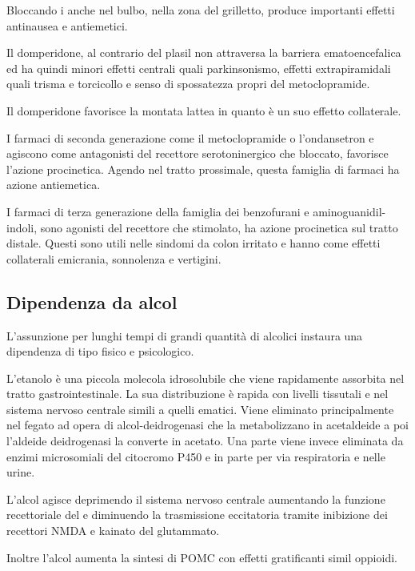 Bloccando i  anche nel bulbo, nella zona del grilletto, produce importanti effetti antinausea e antiemetici.

Il domperidone, al contrario del plasil non attraversa la barriera ematoencefalica ed ha quindi minori effetti centrali quali parkinsonismo, effetti extrapiramidali quali trisma e torcicollo e senso di spossatezza propri del metoclopramide.

Il domperidone favorisce la montata lattea in quanto è un suo effetto collaterale.

I farmaci di seconda generazione come il metoclopramide o l'ondansetron e agiscono come antagonisti del recettore serotoninergico  che bloccato, favorisce l'azione procinetica. Agendo nel tratto prossimale, questa famiglia di farmaci ha azione antiemetica.

I farmaci di terza generazione della famiglia dei benzofurani e aminoguanidil-indoli, sono agonisti del recettore  che stimolato, ha azione procinetica sul tratto distale. Questi sono utili nelle sindomi da colon irritato e hanno come effetti collaterali emicrania, sonnolenza e vertigini.

\subsection{Dipendenza da alcol}

L'assunzione per lunghi tempi di grandi quantità di alcolici instaura una dipendenza di tipo fisico e psicologico.

L'etanolo è una piccola molecola idrosolubile che viene rapidamente assorbita nel tratto gastrointestinale. La sua distribuzione è rapida con livelli tissutali e nel sistema nervoso centrale simili a quelli ematici. Viene eliminato principalmente nel fegato ad opera di alcol-deidrogenasi che la metabolizzano in acetaldeide a poi l'aldeide deidrogenasi la converte in acetato. Una parte viene invece eliminata da enzimi microsomiali del citocromo P450 e in parte per via respiratoria e nelle urine.

L'alcol agisce deprimendo il sistema nervoso centrale aumentando la funzione recettoriale del  e diminuendo la trasmissione eccitatoria tramite inibizione dei recettori NMDA e kainato del glutammato.

Inoltre l'alcol aumenta la sintesi di POMC con effetti gratificanti simil oppioidi.

